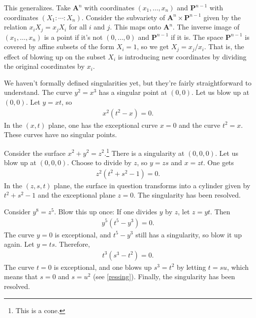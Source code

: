 \documentclass [11 pt, oneside] {article}
\begin{document}
This generalizes. Take $\mathbf{A}^n$ with coordinates $(x_1,\hdots, x_n)$ and $\mathbf{P}^{n-1}$ with coordinates $(X_1:\cdots : X_n)$. Consider the subvariety of $\mathbf{A}^n\times \mathbf{P}^{n-1}$ given by the relation $x_iX_j = x_jX_i$ for all $i$ and $j$. This maps onto $\mathbf{A}^n$. The inverse image of $(x_1,\hdots, x_n)$ is a point if it's not $(0,\hdots, 0)$ and $\mathbf{P}^{n-1}$ if it is. The space $\mathbf{P}^{n-1}$ is covered by affine subsets of the form $X_i=1$, so we get $X_j = x_j/x_i$. That is, the effect of blowing up on the subset $X_i$ is introducing new coordinates by dividing the original coordinates by $x_i$.

\begin{example}\label{ressing}
We haven't formally defined singularities yet, but they're fairly straightforward to understand. The curve $y^2=x^3$ has a singular point at $(0,0)$. Let us blow up at $(0,0)$. Let $y=xt$, so 
\begin{align*}
	x^2(t^2-x)=0.
\end{align*}
In the $(x,t)$ plane, one has the exceptional curve $x=0$ and the curve $t^2=x$. These curves have no singular points.
\end{example}

\begin{example}[ ]\label{}
Consider the surface $x^2+y^2=z^2$.\footnote{This is a cone.} There is a singularity at $(0,0,0)$. Let us blow up at $(0,0,0)$. Choose to divide by $z$, so $y=zs$ and $x=zt$. One gets
\begin{align*}
	z^2(t^2+s^2-1)=0.
\end{align*}
In the $(z,s,t)$ plane, the surface in question transforms into a cylinder given by $t^2+s^2-1$ and the exceptional plane $z=0$. The singularity has been resolved.
\end{example}

\begin{example}[ ]\label{}
Consider $y^8=z^5$. Blow this up once: If one divides $y$ by $z$, let $z=yt$. Then
\begin{align*}
	y^5(t^5-y^3)=0.
\end{align*}
The curve $y=0$ is exceptional, and $t^5-y^3$ still has a singularity, so blow it up again. Let $y= ts$. Therefore,
\begin{align*}
	t^3(s^3-t^2)=0.
\end{align*}
The curve $t=0$ is exceptional, and one blows up $s^3=t^2 $ by letting $t=su$, which means that $s=0$ and $s=u^2$ (see \cref{ressing}). Finally, the singularity has been resolved. 
\end{example}
\end{document}
